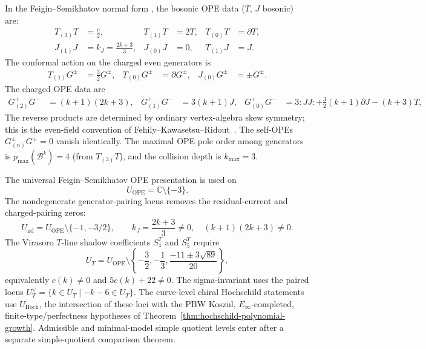 \begin{proposition}
\label{prop:bp-ope-normal-form}
In the Feigin--Semikhatov normal form
\cite[(A.3)]{FeiginSemikhatov}, the bosonic OPE data
($T$, $J$ bosonic) are:
\begin{align}
T_{(3)}T &= \tfrac{c}{2}, &
T_{(1)}T &= 2T, &
T_{(0)}T &= \partial T,
\label{eq:bp-ope-TT} \\
J_{(1)}J &= k_J=\frac{2k+3}{3}, &
J_{(0)}J &= 0, &
T_{(1)}J &= J.
\label{eq:bp-ope-bosonic}
\end{align}
The conformal action on the charged even generators is
\begin{align}
T_{(1)}G^\pm &= \tfrac{3}{2}G^\pm, &
T_{(0)}G^\pm &= \partial G^\pm, &
J_{(0)}G^\pm &= \pm G^\pm .
\label{eq:bp-ope-primary}
\end{align}
The charged OPE data are
\begin{align}
G^+_{(2)}G^- &= (k+1)(2k+3), &
G^+_{(1)}G^- &= 3(k+1)J, &
G^+_{(0)}G^- &= 3{:}JJ{:}+\tfrac{3}{2}(k+1)\partial J-(k+3)T,
\label{eq:bp-ope-GpGm}
\end{align}
The reverse products are determined by ordinary vertex-algebra skew
symmetry; this is the even-field convention of
Fehily--Kawasetsu--Ridout~\cite[Definition~2.1]{FKR20}.
The self-OPEs $G^\pm_{(n)} G^\pm = 0$ vanish identically. The
maximal OPE pole order among generators is $p_{\max}(\mathcal{B}^k) = 4$
(from $T_{(3)}T$), and the collision depth is $k_{\max} = 3$.
\end{proposition}

\begin{convention}
\label{conv:bp-generic-loci}
The universal Feigin--Semikhatov OPE presentation is used on
\[
U_{\mathrm{OPE}}=\mathbb{C}\setminus\{-3\}.
\]
The nondegenerate generator-pairing locus removes the residual-current
and charged-pairing zeros:
\[
U_{\mathrm{nd}}
=U_{\mathrm{OPE}}\setminus\{-1,-3/2\},
\qquad
k_J=\frac{2k+3}{3}\ne0,\quad
(k+1)(2k+3)\ne0.
\]
The Virasoro $T$-line shadow coefficients
$S_4^T$ and $S_5^T$ require
\[
U_T
=U_{\mathrm{OPE}}\setminus
\left\{
-\frac32,-\frac13,
\frac{-11\pm3\sqrt{89}}{20}
\right\},
\]
equivalently $c(k)\ne0$ and $5c(k)+22\ne0$. The sigma-invariant uses
the paired locus $U_T^\vee=\{k\in U_T\mid -k-6\in U_T\}$.
The curve-level chiral Hochschild statements use
$U_{\mathrm{Hoch}}$, the intersection of these loci with the PBW
Koszul, $E_\infty$-completed, finite-type/perfectness hypotheses of
Theorem~\ref{thm:hochschild-polynomial-growth}.  Admissible and
minimal-model simple quotient levels enter after a separate
simple-quotient comparison theorem.
\end{convention}


